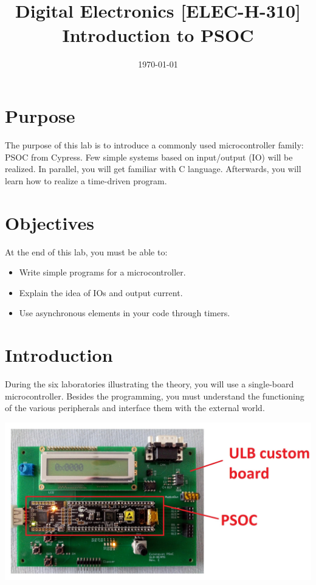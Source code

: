 \documentclass[11pt,a4paper]{article}
\date{\vspace{-1.7cm}\mydate\today}
\title{\vspace{-2cm} \labonumber\\ Digital Electronics [ELEC-H-310]\\ Introduction to PSOC\ifthenelse{\boolean{corrige}}{\\Solution}{}}
\theoremstyle{definition}%
\begin{document}
\pagestyle{empty}
\maketitle
\section*{Purpose}
The purpose of this lab is to introduce a commonly used microcontroller family: PSOC from Cypress.
Few simple systems based on input/output (IO) will be realized.
In parallel, you will get familiar with C language.
Afterwards, you will learn how to realize a time-driven program.


\section*{Objectives}
At the end of this lab, you must be able to:
\begin{itemize}
\item Write simple programs for a microcontroller.
\item Explain the idea of IOs and output current.
\item Use asynchronous elements in your code through timers.
\end{itemize}
\newpage{}


\section{Introduction}
During the six laboratories illustrating the theory, you will use a single-board microcontroller.
Besides the programming, you must understand the functioning of the various peripherals and interface them with the external world.

\includegraphics[width=\textwidth]{ULB_custom_board_and_PSOC}
\end{document}
